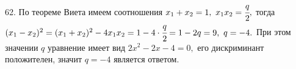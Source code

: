 62. По теореме Виета имеем соотношения $x_1+x_2=1,\ x_1x_2=\cfrac{q}{2},$ тогда $(x_1-x_2)^2=(x_1+x_2)^2-4x_1x_2=1-4\cdot\cfrac{q}{2}=1-2q=9,\ q=-4.$ При этом значении $q$ уравнение имеет вид $2x^2-2x-4=0,$ его дискриминант положителен, значит $q=-4$ является ответом.\\
